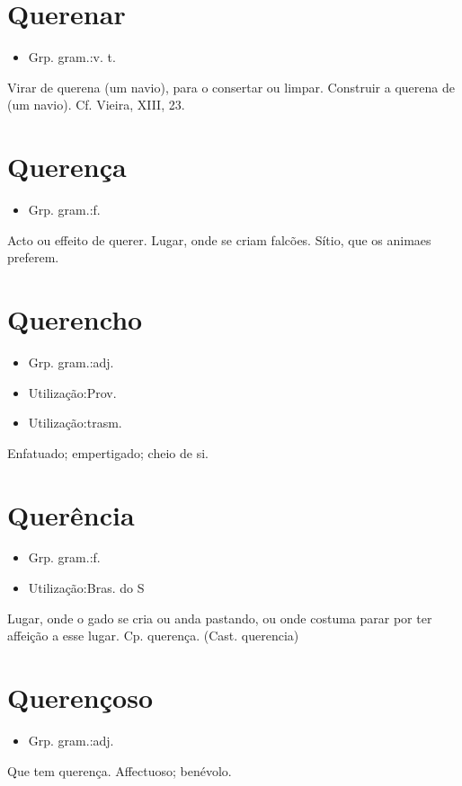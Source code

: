 \section{Querenar}
\begin{itemize}
\item {Grp. gram.:v. t.}
\end{itemize}
Virar de querena (um navio), para o consertar ou limpar.
Construir a querena de (um navio). Cf. Vieira, XIII, 23.
\section{Querença}
\begin{itemize}
\item {Grp. gram.:f.}
\end{itemize}
Acto ou effeito de querer.
Lugar, onde se criam falcões.
Sítio, que os animaes preferem.
\section{Querencho}
\begin{itemize}
\item {Grp. gram.:adj.}
\end{itemize}
\begin{itemize}
\item {Utilização:Prov.}
\end{itemize}
\begin{itemize}
\item {Utilização:trasm.}
\end{itemize}
Enfatuado; empertigado; cheio de si.
\section{Querência}
\begin{itemize}
\item {Grp. gram.:f.}
\end{itemize}
\begin{itemize}
\item {Utilização:Bras. do S}
\end{itemize}
Lugar, onde o gado se cria ou anda pastando, ou onde costuma parar por ter affeição a esse lugar.
Cp. \textunderscore querença\textunderscore .
(Cast. \textunderscore querencia\textunderscore )
\section{Querençoso}
\begin{itemize}
\item {Grp. gram.:adj.}
\end{itemize}
Que tem querença.
Affectuoso; benévolo.
